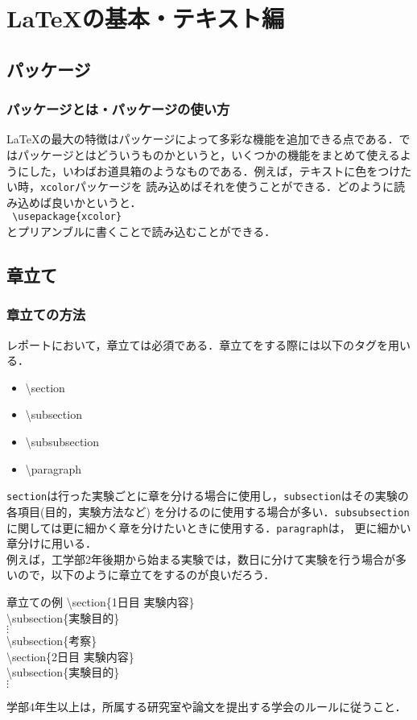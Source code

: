 \section{\LaTeX の基本・テキスト編}
\subsection{パッケージ}
\subsubsection{パッケージとは・パッケージの使い方}
\LaTeX の最大の特徴はパッケージによって多彩な機能を追加できる点である．ではパッケージとはどういうものかというと，いくつかの機能をまとめて使えるようにした，いわばお道具箱のようなものである．例えば，テキストに色をつけたい時，\texttt{xcolor}パッケージを
読み込めばそれを使うことができる．どのように読み込めば良いかというと．\\
\texttt{
\indent
\textbackslash usepackage\{xcolor\}
}\\
とプリアンブルに書くことで読み込むことができる．
\subsection{章立て}
\subsubsection{章立ての方法}
レポートにおいて，章立ては必須である．章立てをする際には以下のタグを用いる．
\begin{itemize}
  \item \ttfamily \textbackslash section
  \item \textbackslash subsection
  \item \textbackslash subsubsection
  \item \textbackslash paragraph
\end{itemize}
\texttt{section}は行った実験ごとに章を分ける場合に使用し，\texttt{subsection}はその実験の各項目(目的，実験方法など)
を分けるのに使用する場合が多い．\texttt{subsubsection}に関しては更に細かく章を分けたいときに使用する．\texttt{paragraph}は，
更に細かい章分けに用いる．\\
例えば，工学部2年後期から始まる実験では，数日に分けて実験を行う場合が多いので，以下のように章立てをするのが良いだろう．
\begin{itembox}[c]{章立ての例}
  \ttfamily
  \textbackslash section\{1日目 実験内容\}\\
  \textbackslash subsection\{実験目的\}\\
  $\vdots$\\
  \textbackslash subsection\{考察\}\\
  \textbackslash section\{2日目 実験内容\}\\
  \textbackslash subsection\{実験目的\}\\
  $\vdots$
\end{itembox}
学部4年生以上は，所属する研究室や論文を提出する学会のルールに従うこと．
